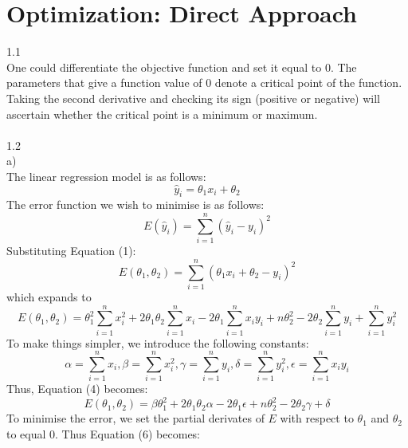 \documentclass[10pt]{article}
\begin{document}
\maketitle
\section{Optimization: Direct Approach}
1.1\\
One could differentiate the objective function and set it equal to 0. The parameters that give a function value of 0 denote a critical point of the function. Taking the second derivative and checking its sign (positive or negative) will ascertain whether the critical point is a minimum or maximum.\\\\
1.2\\
a)\\
The linear regression model is as follows:
\begin{equation}
\hat{y}_{i} = \theta_{1} x_{i} + \theta_{2}
\end{equation}
The error function we wish to minimise is as follows:
\begin{equation}
E(\hat{y}_{i}) = \sum\limits_{i=1}^n (\hat{y}_{i}-y_{i})^2
\end{equation}
Substituting Equation (1):
\begin{equation}
E(\theta_{1},\theta_{2}) = \sum\limits_{i=1}^n (\theta_{1} x_{i} + \theta_{2}-y_{i})^2
\end{equation}
which expands to
\begin{equation}
E(\theta_{1},\theta_{2}) = \theta_{1}^2 \sum\limits_{i=1}^n x_{i}^2 +2\theta_{1} \theta_{2} \sum\limits_{i=1}^n x_{i} - 2 \theta_{1} \sum\limits_{i=1}^n x_{i} y_{i} + n \theta_{2}^2 - 2 \theta_{2} \sum\limits_{i=1}^n y_{i} + \sum\limits_{i=1}^n y_{i}^2
\end{equation}
To make things simpler, we introduce the following constants:
\begin{equation}
\alpha = \sum\limits_{i=1}^n x_{i},\beta = \sum\limits_{i=1}^n x_{i}^2, \gamma = \sum\limits_{i=1}^n y_{i}, \delta = \sum\limits_{i=1}^n y_{i}^2, \epsilon = \sum\limits_{i=1}^n x_{i} y_{i}
\end{equation}
Thus, Equation (4) becomes:
\begin{equation}
E(\theta_{1},\theta_{2}) = \beta \theta_{1}^2 + 2 \theta_{1} \theta_{2} \alpha - 2 \theta_{1} \epsilon + n \theta_{2}^2 - 2 \theta_{2} \gamma + \delta
\end{equation}
To minimise the error, we set the partial derivates of $E$ with respect to $\theta_{1}$ and $\theta_{2}$ to equal 0. Thus Equation (6) becomes:
\end{document}
